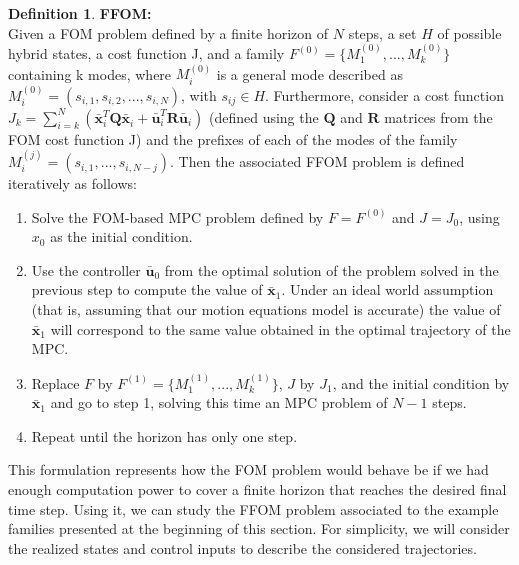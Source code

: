 \documentclass[12,twoside]{TFG-GM}
\theoremstyle{definition}
\newtheorem{definition}[theorem]{Definition}
\theoremstyle{remark}
\newcommand*\diff[1]{\bar{#1}}
\begin{document}
\begin{definition} {\textbf{FFOM:}}\\
Given a FOM problem defined by a finite horizon of $N$ steps, a set $H$ of possible hybrid states, a cost function J, and a family $F^{(0)} = \{M_1^{(0)}, ..., M_k^{(0)}\}$ containing k modes, where $M_i^{(0)}$ is a general mode described as $M_i^{(0)} = (s_{i,1}, s_{i,2}, ..., s_{i,N})$, with $s_{ij} \in H$. Furthermore, consider a cost function $J_k = \sum\limits_{i = k}^{N} \left( \diff{\textbf{x}}_i^T \textbf{Q} \diff{\textbf{x}}_i^{} + \diff{\textbf{u}}_{i}^T \textbf{R} \diff{\textbf{u}}_{i}^{} \right)$ (defined using the $\textbf{Q}$ and $\textbf{R}$ matrices from the FOM cost function J) and the prefixes of each of the modes of the family $M_i^{(j)} = (s_{i,1}, ..., s_{i,N-j})$. Then the associated FFOM problem is defined iteratively as follows:

\begin{enumerate}
\item Solve the FOM-based MPC problem defined by $F = F^{(0)}$ and $J = J_0$, using $x_0$ as the initial condition.
\item Use the controller $\diff{\textbf{u}}_0$ from the optimal solution of the problem solved in the previous step to compute the value of $\diff{\textbf{x}}_1$. Under an ideal world assumption (that is, assuming that our motion equations model is accurate) the value of $\diff{\textbf{x}}_1$ will correspond to the same value obtained in the optimal trajectory of the MPC.
\item Replace $F$ by  $F^{(1)} = \{M_1^{(1)}, ..., M_k^{(1)}\}$, $J$ by $J_1$, and the initial condition by $\diff{\textbf{x}}_1$ and go to step 1, solving this time an MPC problem of $N - 1$ steps.
\item Repeat until the horizon has only one step.
\end{enumerate}

\end{definition}


This formulation represents how the FOM problem would behave be if we had enough computation power to cover a finite horizon that reaches the desired final time step. Using it, we can study the FFOM problem associated to the example families presented at the beginning of this section. For simplicity, we will consider the realized states and control inputs to describe the considered trajectories.
\end{document}
